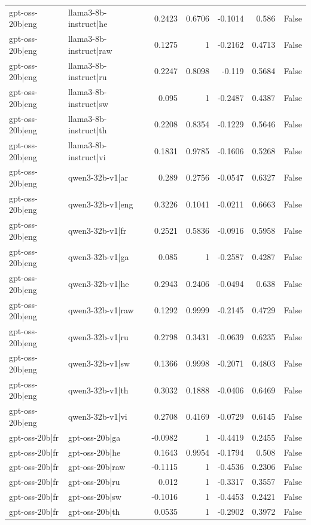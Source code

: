 \begin{table}
\begin{tabular}{l l r r r r l}
gpt-oss-20b|eng & llama3-8b-instruct|he & 0.2423 & 0.6706 & -0.1014 & 0.586 & False \\
gpt-oss-20b|eng & llama3-8b-instruct|raw & 0.1275 & 1 & -0.2162 & 0.4713 & False \\
gpt-oss-20b|eng & llama3-8b-instruct|ru & 0.2247 & 0.8098 & -0.119 & 0.5684 & False \\
gpt-oss-20b|eng & llama3-8b-instruct|sw & 0.095 & 1 & -0.2487 & 0.4387 & False \\
gpt-oss-20b|eng & llama3-8b-instruct|th & 0.2208 & 0.8354 & -0.1229 & 0.5646 & False \\
gpt-oss-20b|eng & llama3-8b-instruct|vi & 0.1831 & 0.9785 & -0.1606 & 0.5268 & False \\
gpt-oss-20b|eng & qwen3-32b-v1|ar & 0.289 & 0.2756 & -0.0547 & 0.6327 & False \\
gpt-oss-20b|eng & qwen3-32b-v1|eng & 0.3226 & 0.1041 & -0.0211 & 0.6663 & False \\
gpt-oss-20b|eng & qwen3-32b-v1|fr & 0.2521 & 0.5836 & -0.0916 & 0.5958 & False \\
gpt-oss-20b|eng & qwen3-32b-v1|ga & 0.085 & 1 & -0.2587 & 0.4287 & False \\
gpt-oss-20b|eng & qwen3-32b-v1|he & 0.2943 & 0.2406 & -0.0494 & 0.638 & False \\
gpt-oss-20b|eng & qwen3-32b-v1|raw & 0.1292 & 0.9999 & -0.2145 & 0.4729 & False \\
gpt-oss-20b|eng & qwen3-32b-v1|ru & 0.2798 & 0.3431 & -0.0639 & 0.6235 & False \\
gpt-oss-20b|eng & qwen3-32b-v1|sw & 0.1366 & 0.9998 & -0.2071 & 0.4803 & False \\
gpt-oss-20b|eng & qwen3-32b-v1|th & 0.3032 & 0.1888 & -0.0406 & 0.6469 & False \\
gpt-oss-20b|eng & qwen3-32b-v1|vi & 0.2708 & 0.4169 & -0.0729 & 0.6145 & False \\
gpt-oss-20b|fr & gpt-oss-20b|ga & -0.0982 & 1 & -0.4419 & 0.2455 & False \\
gpt-oss-20b|fr & gpt-oss-20b|he & 0.1643 & 0.9954 & -0.1794 & 0.508 & False \\
gpt-oss-20b|fr & gpt-oss-20b|raw & -0.1115 & 1 & -0.4536 & 0.2306 & False \\
gpt-oss-20b|fr & gpt-oss-20b|ru & 0.012 & 1 & -0.3317 & 0.3557 & False \\
gpt-oss-20b|fr & gpt-oss-20b|sw & -0.1016 & 1 & -0.4453 & 0.2421 & False \\
gpt-oss-20b|fr & gpt-oss-20b|th & 0.0535 & 1 & -0.2902 & 0.3972 & False \\

\end{tabular}
\end{table}

